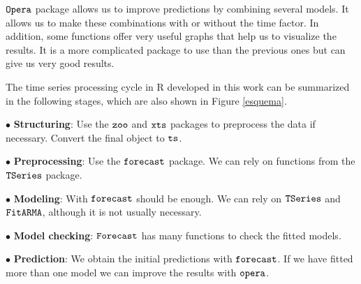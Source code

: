 \documentclass[12pt,a4paper,oneside]{article}
\begin{document}
$\verb!Opera!$ package allows us to improve predictions by combining several models. It allows us to make these combinations with or without the time factor. In addition, some functions offer very useful graphs that help us to visualize the results. It is a more complicated package to use than the previous ones but can give us very good results.

The time series processing cycle in R developed in this work can be summarized in the following stages, which are also shown in Figure \ref{esquema}.

\begin{itemize*}
  \item[$\bullet$]\textbf{Structuring}: Use the $\verb!zoo!$ and $\verb!xts!$ packages to preprocess the data if necessary. Convert the final object to $\verb!ts!$.
  \item[$\bullet$]\textbf{Preprocessing}: Use the $\verb!forecast!$ package. We can rely on functions from the $\verb!TSeries!$ package.
  \item[$\bullet$]\textbf{Modeling}: With $\verb!forecast!$ should be enough. We can rely on $\verb!TSeries!$ and $\verb!FitARMA!$, although it is not usually necessary.
  \item[$\bullet$]\textbf{Model checking}: $\verb!Forecast!$ has many functions to check the fitted models.
  \item[$\bullet$]\textbf{Prediction}: We obtain the initial predictions with $\verb!forecast!$. If we have fitted more than one model we can improve the results with $\verb!opera!$.
\end{itemize*}
\end{document}
